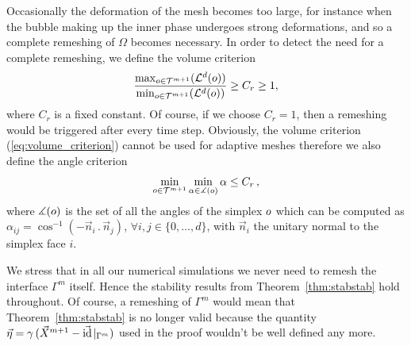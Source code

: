 Occasionally the deformation of the mesh becomes too large, for instance when
the bubble making up the inner phase undergoes strong deformations, and so a
complete remeshing of $\Omega$ becomes necessary. In order to detect the need
for a complete remeshing, we define the volume criterion
\begin{equation}\label{eq:volume_criterion}
\frac{\max_{o\in {\cal T}^{m+1}}(\mathcal{L}^d(o))}
{\min_{o\in\mathcal {T}^{m+1}}(\mathcal{L}^d(o))} \geq C_r \geq 1,
\end{equation}
where $C_r$ is a fixed constant. Of course, if we choose $C_r = 1$, then a
remeshing would be triggered after every time step. Obviously, the
volume criterion (\ref{eq:volume_criterion}) cannot be used for adaptive
meshes therefore we also define the angle criterion
\begin{equation}\label{eq:angle_criterion}
\min_{o\in {\cal T}^{m+1}}\min_{\alpha\in \measuredangle(o)}\alpha
\leq C_r\,,
\end{equation}
where $\measuredangle(o)$ is the set of all the angles of the simplex
$o$ which can be computed as $\alpha_{ij}=\cos^{-1}(-\vec n_i\,.\,\vec
n_j)$, $\forall i,j\in\{0,\dots,d\}$, with $\vec n_i$ the unitary normal to the
simplex face $i$.

We stress that in all our numerical simulations we never need to remesh the
interface $\Gamma^m$ itself. Hence the stability results from
Theorem~\ref{thm:stabstab} hold throughout. Of course, a remeshing of $\Gamma^m$
would mean that Theorem~\ref{thm:stabstab} is no longer valid because the
quantity $\vec\eta=\gamma\,({\vec{X}^{m+1}-\vec{\rm id}\!\mid_{\Gamma^m}})$ used in
the proof wouldn't be well defined any more.

